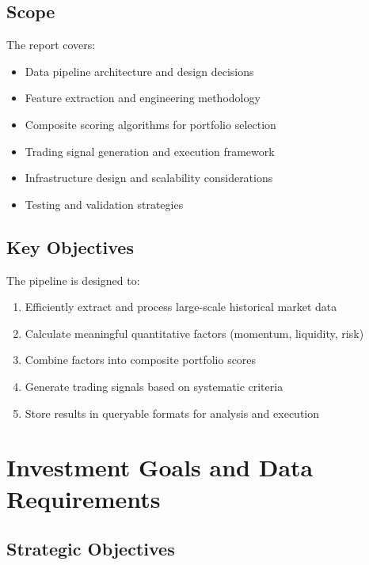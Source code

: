 \documentclass[11pt, a4paper, twoside]{article}
\begin{document}
\subsection{Scope}

The report covers:
\begin{itemize}
    \item Data pipeline architecture and design decisions
    \item Feature extraction and engineering methodology
    \item Composite scoring algorithms for portfolio selection
    \item Trading signal generation and execution framework
    \item Infrastructure design and scalability considerations
    \item Testing and validation strategies
\end{itemize}

\subsection{Key Objectives}

The pipeline is designed to:
\begin{enumerate}
    \item Efficiently extract and process large-scale historical market data
    \item Calculate meaningful quantitative factors (momentum, liquidity, risk)
    \item Combine factors into composite portfolio scores
    \item Generate trading signals based on systematic criteria
    \item Store results in queryable formats for analysis and execution
\end{enumerate}


\section{Investment Goals and Data Requirements}
\label{sec:investment-goals}

\subsection{Strategic Objectives}
\end{document}
